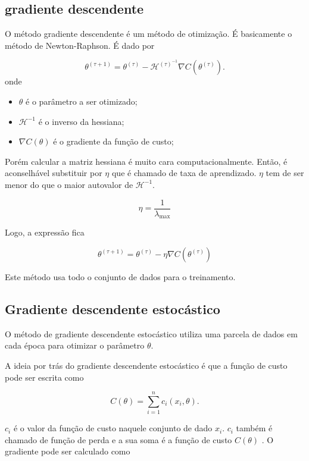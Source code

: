 \documentclass[12pt,titlepage]{article}
\begin{document}
\subsection{gradiente descendente}

O método gradiente descendente é um método de otimização. É basicamente o método de Newton-Raphson. É dado por 

\begin{equation}
	\theta^{(\tau +1)} = \theta^{(\tau)} - \mathcal H^{(\tau)^{-1}} \nabla C(\theta^{(\tau)}).
\end{equation}
onde

\begin{itemize}
	\item $\theta$ é o parâmetro a ser otimizado;
	\item $\mathcal H^{-1}$ é o inverso da hessiana;
	\item $\nabla C(\theta)$ é o gradiente da função de custo;
\end{itemize}
Porém calcular a matriz hessiana é muito cara computacionalmente. Então, é aconselhável substituir por $\eta$ que é chamado de taxa de aprendizado. $\eta$ tem de ser menor do que o maior autovalor de $\mathcal H^{-1}$.

$$ \eta = \frac{1}{\lambda_\text{max}}$$

Logo, a expressão fica 

\begin{equation}
	\theta^{(\tau +1)} = \theta^{(\tau)} - \eta \nabla C(\theta^{(\tau)})
\end{equation}

Este método usa todo o conjunto de dados para o treinamento.

\subsection{Gradiente descendente estocástico}

O método de gradiente descendente estocástico utiliza uma parcela de dados em cada época para otimizar o parâmetro $\theta$.

A ideia por trás do gradiente descendente estocástico é que a função de custo pode ser escrita como

\begin{equation}
	\label{eq: eq. de custo como somatório}
	C(\theta) = \sum_{i=1}^n c_i(x_i,\theta).
\end{equation}

$c_i$ é o valor da função de custo naquele conjunto de dado $x_i$. $c_i$ também é chamado de função de perda e a sua soma é a função de custo $C(\theta)$ \cite{bonaccorso2018mastering}. O gradiente pode ser calculado como
\end{document}
